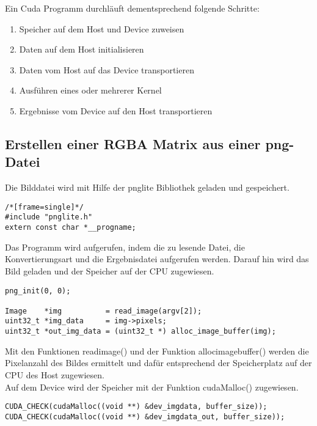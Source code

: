 \documentclass{llncs}
\begin{document}
Ein Cuda Programm durchläuft dementsprechend folgende Schritte:
\begin{enumerate}
	\item Speicher auf dem Host und Device zuweisen
	\item Daten auf dem Host initialisieren
	\item Daten vom Host auf das Device transportieren
	\item Ausführen eines oder mehrerer Kernel
	\item Ergebnisse vom Device auf den Host transportieren
\end{enumerate}


%
\subsection{Erstellen einer RGBA Matrix aus einer png-Datei}
%
Die Bilddatei wird mit Hilfe der pnglite Bibliothek geladen und gespeichert.
\begin{lstlisting}/*[frame=single]*/
#include "pnglite.h"
extern const char *__progname;
\end{lstlisting}

Das Programm wird aufgerufen, indem die zu lesende Datei, die Konvertierungsart und die Ergebnisdatei aufgerufen werden. Darauf hin wird das Bild geladen und der Speicher auf der CPU zugewiesen. \\

\begin{lstlisting}
png_init(0, 0);

Image    *img          = read_image(argv[2]);
uint32_t *img_data     = img->pixels;
uint32_t *out_img_data = (uint32_t *) alloc_image_buffer(img);
\end{lstlisting}

Mit den Funktionen read\textunderscore image() und der Funktion alloc\textunderscore image\textunderscore buffer() werden die Pixelanzahl des Bildes ermittelt und dafür entsprechend der Speicherplatz auf der CPU des Host zugewiesen.\\  

Auf dem Device wird der Speicher mit der Funktion cudaMalloc() zugewiesen.\\ 

\begin{lstlisting}
CUDA_CHECK(cudaMalloc((void **) &dev_imgdata, buffer_size));
CUDA_CHECK(cudaMalloc((void **) &dev_imgdata_out, buffer_size));
\end{lstlisting}
\end{document}
